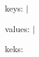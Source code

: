 \documentclass{article}
\def\testlist{}
\begin{document}
keys: \forlistloop{$|$\getKey}{\testlist}$|$ \par
values: \forlistloop{$|$\getVal}{\testlist}$|$ \par
keks: \forlistloop{\getKEK}{\testlist} \par

\end{document}
